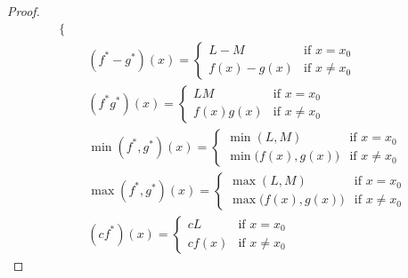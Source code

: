 \begin{proof}
\begin{align*}
\begin{cases}
                                                         \end{cases}                    \\
                                      & (f^* - g^*)(x) = \begin{cases}
                                                             L - M       & \text{if } x = x_0    \\
                                                             f(x) - g(x) & \text{if } x \neq x_0
                                                         \end{cases}                    \\
                                      & (f^* g^*)(x) = \begin{cases}
                                                           LM        & \text{if } x = x_0    \\
                                                           f(x) g(x) & \text{if } x \neq x_0
                                                       \end{cases}                        \\
                                      & \min(f^*, g^*)(x) = \begin{cases}
                                                                \min(L, M)               & \text{if } x = x_0    \\
                                                                \min\big(f(x), g(x)\big) & \text{if } x \neq x_0
                                                            \end{cases}    \\
                                      & \max(f^*, g^*)(x) = \begin{cases}
                                                                \max(L, M)               & \text{if } x = x_0    \\
                                                                \max\big(f(x), g(x)\big) & \text{if } x \neq x_0
                                                            \end{cases}    \\
                                      & (c f^*)(x) = \begin{cases}
                                                         cL     & \text{if } x = x_0    \\
                                                         c f(x) & \text{if } x \neq x_0

\end{cases}
\end{align*}
\end{proof}
